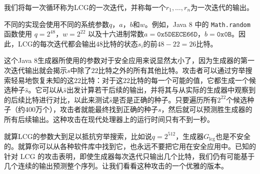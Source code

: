 \vspace*{5pt}
我们将每一次循环称为LCG的一次迭代，并称每一个$r_1,\dots,r_n$为一次迭代的输出。

不同的实现会使用不同的系统参数$q$，$a$，$b$和$w$。例如，Java 8 中的 \texttt{Math.random} 函数使用 $q=2^{48}$，$w=2^{22}$ 以及十六进制常数$a=\texttt{0x5DEECE66D}$，$b=\texttt{0x0B}$。因此，LCG的每次迭代都会输出$48$比特的状态$s_i$的前$48-22=26$比特。

这个Java 8生成器所使用的参数对于安全应用来说显然太小了，因为生成器的第一次迭代输出就会揭示$s$中除了$22$比特之外的所有其他比特。攻击者可以通过穷举搜索轻易地恢复未知的这$22$比特：对于这$22$比特的每一个可能的值，它都生成一个候选种子$\hat s$。它可以从$\hat s$出发计算若干后续的输出，并将其与从实际的生成器中观察到的后续比特进行对比，以此来测试$\hat s$是否是正确的种子。只要遍历所有$2^{22}$个候选种子（约400万个），攻击者就能最终找到正确的种子$s$，然后就可以预测胜生成器的所有后续输出。这种攻击在现代处理器上的运行时间只有不到一秒。

就算LCG的参数大到足以抵抗穷举搜索，比如说$q=2^{512}$，生成器$G_\mathrm{lcg}$也是不安全的。就算你可以从各种软件库中找到它，也永远不要把它用在安全应用中。已知的针对 LCG 的攻击表明，即使生成器每次迭代只输出几个比特，我们仍有可能基于几个连续的输出预测整个序列。让我们看看这种攻击的一个优雅的版本。

